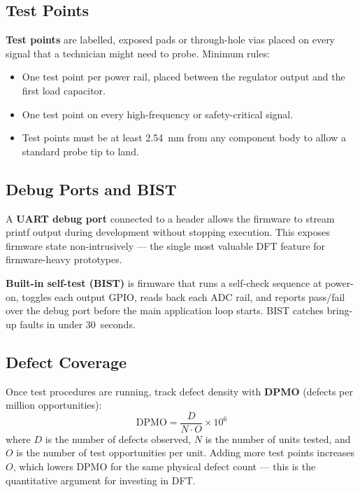 \subsection{Test Points}
\label{sec:ch7-dft-tp}

\textbf{Test points} are labelled, exposed pads or through-hole
vias placed on every signal that a technician might need to probe.
Minimum rules:
\begin{itemize}
  \item One test point per power rail, placed between the regulator output and
        the first load capacitor.
  \item One test point on every high-frequency or safety-critical signal.
  \item Test points must be at least 2.54~mm from any component body to allow
        a standard probe tip to land.
\end{itemize}

\subsection{Debug Ports and BIST}
\label{sec:ch7-dft-debug}

A \textbf{UART debug port} connected to a header allows
the firmware to stream printf output during development without stopping
execution.
This exposes firmware state non-intrusively --- the single most valuable DFT
feature for firmware-heavy prototypes.

\textbf{Built-in self-test (BIST)} is firmware that
runs a self-check sequence at power-on, toggles each output GPIO, reads back
each ADC rail, and reports pass/fail over the debug port before the main
application loop starts.
BIST catches bring-up faults in under 30~seconds.

\subsection{Defect Coverage}
\label{sec:ch7-dft-dpmo}

Once test procedures are running, track defect density with
\textbf{DPMO} (defects per million opportunities):
%
\begin{equation}
  \label{eq:ch7-dpmo}
  \mathrm{DPMO} = \frac{D}{N \cdot O} \times 10^{6}
\end{equation}
%
where $D$ is the number of defects observed, $N$ is the number of units tested,
and $O$ is the number of test opportunities per unit.
Adding more test points increases $O$, which lowers DPMO for the same physical
defect count --- this is the quantitative argument for investing in DFT.

